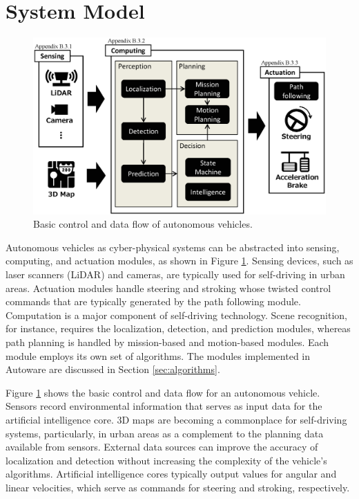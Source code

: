 \section{System Model}
\label{sec:system_model}

\begin{figure}[thbp]
  \centering
  \includegraphics[width=0.9\linewidth]{../figure/Autoware/system_model.eps}
  \caption{\label{fig:system_model}
    Basic control and data flow of autonomous vehicles.}
\end{figure}

Autonomous vehicles as cyber-physical systems can be abstracted into
sensing, computing, and actuation modules, as shown in Figure
\ref{fig:system_model}.
Sensing devices, such as laser scanners (LiDAR) and cameras, are typically used for self-driving in urban areas.
Actuation modules handle steering and stroking whose
twisted control commands that are typically generated by the path following module.
Computation is a major component of self-driving technology.
Scene recognition, for instance, requires the localization, detection, and
prediction modules, whereas path planning is handled by mission-based and
motion-based modules.
Each module employs its own set of algorithms.
The modules implemented in Autoware are discussed in Section
\ref{sec:algorithms}.

Figure \ref{fig:system_model} shows the basic control and data flow for an
autonomous vehicle.
Sensors record environmental information that serves as input data for the
artificial intelligence core.
3D maps are becoming a commonplace for self-driving systems, particularly,
in urban areas as a complement to the planning data available from sensors.
External data sources can improve the accuracy of
localization and detection without increasing the complexity of the vehicle's algorithms.
Artificial intelligence cores typically output values for angular and linear
velocities, which serve as commands for steering and stroking, respectively.


